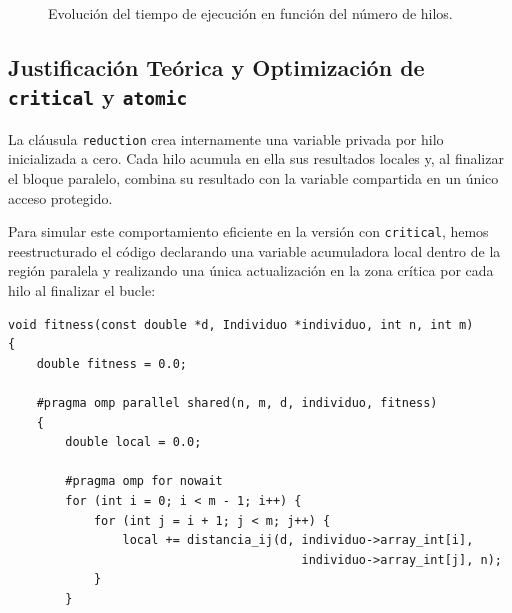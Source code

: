 \documentclass[12pt]{article}
\begin{document}
\begin{enumerate}
\begin{figure}[htbp]
    \caption{Evolución del tiempo de ejecución en función del número de hilos.}
    \label{fig:tiempos_cuestion3}
\end{figure}


\subsection*{Justificación Teórica y Optimización de \texttt{critical} y \texttt{atomic}}

La cláusula \texttt{reduction} crea internamente una variable privada por hilo inicializada a cero. Cada hilo acumula en ella sus resultados locales y, al finalizar el bloque paralelo, combina su resultado con la variable compartida en un único acceso protegido.

Para simular este comportamiento eficiente en la versión con \texttt{critical}, hemos reestructurado el código declarando una variable acumuladora local dentro de la región paralela y realizando una única actualización en la zona crítica por cada hilo al finalizar el bucle:

\begin{lstlisting}[caption={Simulación de reducción mediante acumulación local y \texttt{critical}.}, style={EstiloC}]
void fitness(const double *d, Individuo *individuo, int n, int m)
{
    double fitness = 0.0;

    #pragma omp parallel shared(n, m, d, individuo, fitness)
    {
        double local = 0.0;

        #pragma omp for nowait
        for (int i = 0; i < m - 1; i++) {
            for (int j = i + 1; j < m; j++) {
                local += distancia_ij(d, individuo->array_int[i], 
                                         individuo->array_int[j], n);
            }
        }


\end{lstlisting}
\end{enumerate}
\end{document}
